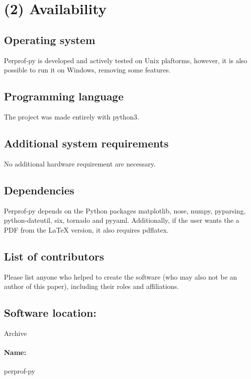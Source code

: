 \documentclass[10pt,a4paper]{article}
\begin{document}
\section*{(2) Availability}

\subsection*{Operating system}

    Perprof-py is developed and actively tested on Unix plaftorms, however, it
    is also possible to run it on Windows, removing some features.

\subsection*{Programming language}

    The project was made entirely with python3.

\subsection*{Additional system requirements}

    No additional hardware requirement are necessary.

\subsection*{Dependencies}

    Perprof-py depends on the Python packages matplotlib, nose, numpy,
    pyparsing, python-dateutil, six, tornado and pyyaml. Additionally, if the
    user wants the a PDF from the LaTeX version, it also requires pdflatex.

\subsection*{List of contributors}

    Please list anyone who helped to create the software (who may also not be an
    author of this paper), including their roles and affiliations.

\subsection*{Software location:}

    Archive

    \paragraph{Name:} perprof-py
\end{document}
